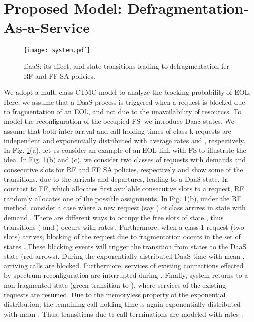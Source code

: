 \documentclass[letterpaper,10pt]{article}
\begin{document}
\section{Proposed Model: Defragmentation-As-a-Service}
\begin{figure}[t]
 \centering
\texttt{[image: system.pdf]}
\vspace{-8mm}
  \caption{DaaS: its effect, and state transitions leading to defragmentation for RF and FF SA policies.}
\label{fig:system}
\vspace{-2mm}
\end{figure}
\vspace{-1mm}
We adopt a multi-class CTMC model to analyze the blocking probability of EOL.
Here, we assume that a DaaS process is triggered when a request is blocked due to fragmentation of an EOL, and not due to the unavailability of resources. To model the reconfiguration of the occupied FS, we introduce DaaS states. We assume that both inter-arrival  and call holding times of class-k requests are independent and  exponentially distributed with average rates  and  , respectively. In Fig. \ref{fig:system}(a), let us consider an example of an EOL link with  FS to illustrate the idea.  In Fig. \ref{fig:system}(b) and (c), we consider two classes of requests with demands  and  consecutive slots for RF and FF SA policies, respectively and show some of the transitions, due to the arrivals and departures, leading to a DaaS state. In contrast to FF, which allocates first available consecutive slots to a request, RF randomly allocates one of the possible assignments. In Fig. \ref{fig:system}(b), under the RF method, consider a case where a new request (say ) of class  arrives in state  with demand . There are  different ways to occupy the  free slots of state , thus transitions ( and ) occurs with rates .
Furthermore, when a class-1 request (two slots) arrives, blocking of the request due to fragmentation occurs in the set of states . 
These blocking events will trigger the transition from states   to the DaaS state  (red arrows). During the exponentially distributed DaaS time  with mean , arriving calls are blocked. Furthermore, services of existing connections effected by spectrum reconfiguration are interrupted during . Finally, system returns to a non-fragmented state (green transition to ), where services of the existing requests are resumed. Due to the memoryless property of the exponential distribution, the remaining call holding time is again exponentially distributed with mean . Thus, transitions due to call terminations are modeled with rates .
\end{document}
